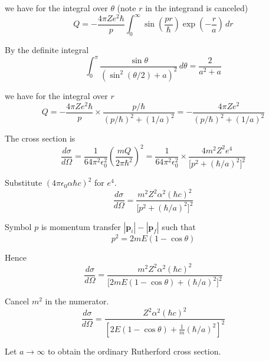we have for the integral over $\theta$ (note $r$ in the integrand is canceled)
\begin{equation*}
Q=-\frac{4\pi Ze^2\hbar}{p}
\int_0^\infty\sin\left(\frac{pr}{\hbar}\right)
\exp\left(-\frac{r}{a}\right)
\,dr
\end{equation*}

By the definite integral
\begin{equation*}
\int_0^\pi\frac{\sin\theta}{\left(\sin^2(\theta/2)+a\right)^2}\,d\theta=\frac{2}{a^2+a}
\end{equation*}

we have for the integral over $r$
\begin{equation*}
Q=-\frac{4\pi Ze^2\hbar}{p}\times
\frac{p/\hbar}
{(p/\hbar)^2+(1/a)^2}
=-\frac{4\pi Ze^2}{(p/\hbar)^2+(1/a)^2}
\end{equation*}

The cross section is
\begin{equation*}
\frac{d\sigma}{d\Omega}
=\frac{1}{64\pi^2\epsilon_0^2}
\left(\frac{mQ}{2\pi\hbar^2}\right)^2
=\frac{1}{64\pi^2\epsilon_0^2}\times\frac{4m^2Z^2e^4}{\bigl[p^2+(\hbar/a)^2\bigr]^2}
\end{equation*}

Substitute $(4\pi\epsilon_0\alpha\hbar c)^2$ for $e^4$.
\begin{equation*}
\frac{d\sigma}{d\Omega}
=\frac{m^2Z^2\alpha^2(\hbar c)^2}{\bigl[p^2+(\hbar/a)^2\bigr]^2}
\end{equation*}

Symbol $p$ is momentum transfer $|\mathbf p_i|-|\mathbf p_f|$ such that
\begin{equation*}
p^2=2mE(1-\cos\theta)
\end{equation*}

Hence
\begin{equation*}
\frac{d\sigma}{d\Omega}
=\frac{m^2Z^2\alpha^2(\hbar c)^2}{\bigl[2mE(1-\cos\theta)+(\hbar/a)^2\bigr]^2}
\end{equation*}

Cancel $m^2$ in the numerator.
\begin{equation*}
\frac{d\sigma}{d\Omega}
=\frac{Z^2\alpha^2(\hbar c)^2}{\left[2E(1-\cos\theta)+\frac{1}{m}(\hbar/a)^2\right]^2}
\tag{1}
\end{equation*}

Let $a\rightarrow\infty$ to obtain the ordinary Rutherford cross section.


